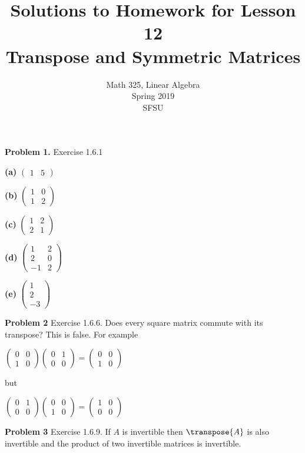 \documentclass[oneside,12pt]{amsart}
\begin{document}
\title{Solutions to Homework for Lesson 12 \\ Transpose and Symmetric Matrices}
\author{Math 325, Linear Algebra \\ Spring 2019\\ SFSU }
\date{}

\maketitle


\textbf{Problem 1.} Exercise 1.6.1

\textbf{(a)}
$
\begin{pmatrix}
1 & 5
\end{pmatrix}
$

\textbf{(b)}
$
\begin{pmatrix}
1 & 0 \\
1 & 2
\end{pmatrix}
$


\textbf{(c)}
$
\begin{pmatrix}
1 & 2 \\
2 & 1
\end{pmatrix}
$

\textbf{(d)}
$
\begin{pmatrix}
1 & 2 \\
2 & 0 \\
-1 & 2
\end{pmatrix}
$


\textbf{(e)}
$
\begin{pmatrix}
1 \\ 2 \\ -3
\end{pmatrix}
$

\bigskip

\textbf{Problem 2} Exercise 1.6.6. Does every square matrix commute with its transpose?
This is false. For example


$
\begin{pmatrix}
0 & 0 \\
1 & 0
\end{pmatrix}
\begin{pmatrix}
0 & 1 \\
0 & 0
\end{pmatrix}
=
\begin{pmatrix}
0 & 0 \\
1 & 0
\end{pmatrix}
$

but

$
\begin{pmatrix}
0 & 1 \\
0 & 0
\end{pmatrix}
\begin{pmatrix}
0 & 0 \\
1 & 0
\end{pmatrix}
=
\begin{pmatrix}
1 & 0 \\
0 & 0
\end{pmatrix}
$

\bigskip

\textbf{Problem 3} Exercise 1.6.9. If $A$ is invertible then $\transpose{A}$
is also invertible and the product of two invertible matrices is invertible.
\end{document}
